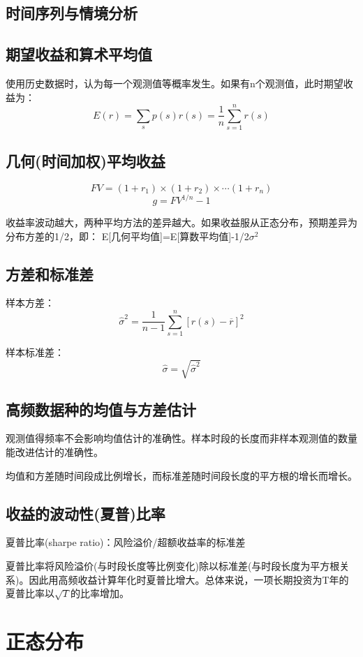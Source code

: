 \documentclass{article}
\begin{document}
\subsection{时间序列与情境分析}

\subsection{期望收益和算术平均值}
使用历史数据时，认为每一个观测值等概率发生。如果有n个观测值，此时期望收益为：
\[
E(r)=\sum_sp(s)r(s)=\frac{1}{n}\sum_{s=1}^{n}r(s)
\]
\subsection{几何(时间加权)平均收益}
\[
FV=(1+r_1)\times(1+r_2)\times\cdots(1+r_n)
\]
\[
g=FV^{1/n}-1
\]

收益率波动越大，两种平均方法的差异越大。如果收益服从正态分布，预期差异为分布方差的1/2，即：
E[几何平均值]=E[算数平均值]-1/2$ \sigma^2 $

\subsection{方差和标准差}
样本方差：
\[
\hat{\sigma}^2=\frac{1}{n-1}\sum_{s=1}^{n}[r(s)-\overline{r}]^2
\]

样本标准差：
\[
\hat{\sigma}=\sqrt{\hat{\sigma}^2}
\]

\subsection{高频数据种的均值与方差估计}
观测值得频率不会影响均值估计的准确性。样本时段的长度而非样本观测值的数量能改进估计的准确性。

均值和方差随时间段成比例增长，而标准差随时间段长度的平方根的增长而增长。

\subsection{收益的波动性(夏普)比率}
夏普比率(sharpe ratio)：风险溢价/超额收益率的标准差

夏普比率将风险溢价(与时段长度等比例变化)除以标准差(与时段长度为平方根关系)。因此用高频收益计算年化时夏普比增大。总体来说，一项长期投资为T年的夏普比率以$ \sqrt{T} $的比率增加。

\section{正态分布}
\end{document}
